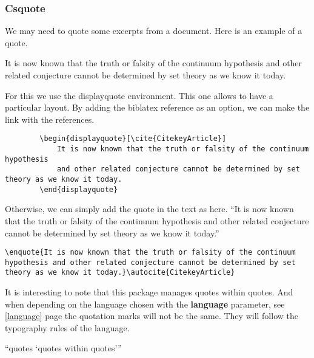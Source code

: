 \subsubsection{Csquote}
We may need to quote some excerpts from a document. Here is an example of a quote.
\begin{displayquote}
    It is now known that the truth or falsity of the continuum hypothesis
    and other related conjecture cannot be determined by set theory as we know it today.
\end{displayquote}

For this we use the displayquote environment. This one allows to have a particular layout.
By adding the biblatex reference as an option, we can make the link with the references.
\begin{code}
    \begin{verbatim}
        \begin{displayquote}[\cite{CitekeyArticle}]
            It is now known that the truth or falsity of the continuum hypothesis
            and other related conjecture cannot be determined by set theory as we know it today.
        \end{displayquote}
\end{verbatim}
    \caption{Use of displayquote}
\end{code}
Otherwise, we can simply add the quote in the text as here. \enquote{It is now known that the truth or falsity of the continuum hypothesis
    and other related conjecture cannot be determined by set theory as we know it today.}\autocite{CitekeyArticle}
\begin{code}
    \begin{verbatim}
\enquote{It is now known that the truth or falsity of the continuum hypothesis and other related conjecture cannot be determined by set theory as we know it today.}\autocite{CitekeyArticle}
\end{verbatim}
    \caption{Use of enquote}
\end{code}

It is interesting to note that this package manages quotes within quotes.
And when depending on the language chosen with the \textbf{language} parameter, see \ref{language} page \pageref{language}
the quotation marks will not be the same. They will follow the typography rules of the language.

\enquote{quotes \enquote{quotes within quotes}}

